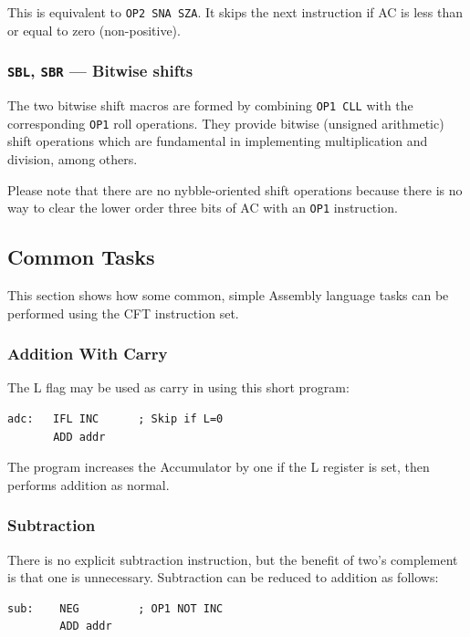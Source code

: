 \documentclass[11pt,a4paper,twocolumns]{article}
\newcommand\register[1]{\textsf{#1}}
\newcommand\A{\register{AC}}
\newcommand\Lreg{\register{L}}
\begin{document}
This is equivalent to {\tt OP2 SNA SZA}. It skips the next instruction
if \A{} is less than or equal to zero (non-positive).

\subsubsection{{\tt SBL}, {\tt SBR} — Bitwise shifts}

The two bitwise shift macros are formed by combining {\tt OP1 CLL} with
the corresponding {\tt OP1} roll operations. They provide bitwise
(unsigned arithmetic) shift operations which are fundamental in
implementing multiplication and division, among others.

Please note that there are no nybble-oriented shift operations because
there is no way to clear the lower order three bits of \A{} with an
{\tt OP1} instruction.

\subsection{Common Tasks}

This section shows how some common, simple Assembly language tasks can
be performed using the CFT instruction set.

\subsubsection{Addition With Carry}

The \Lreg{} flag may be used as carry in using this short program:
\begin{verbatim}
adc:   IFL INC      ; Skip if L=0
       ADD addr
\end{verbatim}

The program increases the Accumulator by one if the \Lreg{} register is set,
then performs addition as normal.

\subsubsection{Subtraction}

There is no explicit subtraction instruction, but the benefit of two's
complement is that one is unnecessary. Subtraction can be reduced to
addition as follows:

\begin{verbatim}
sub:    NEG         ; OP1 NOT INC
        ADD addr
\end{verbatim}
\end{document}
